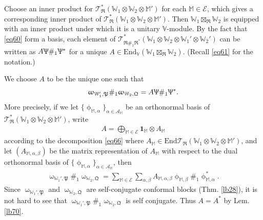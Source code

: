 \documentclass[11pt,b5paper,notitlepage]{article}
\theoremstyle{definition}
\theoremstyle{plain}
\newcommand{\fk}{\mathfrak}
\newcommand{\mc}{\mathcal}
\newcommand{\End}{\mathrm{End}} %
\newcommand{\id}{\mathbf{1}}
\newcommand{\scr}{\mathscr}
\newcommand{\Vbb}{\mathbb V}
\newcommand{\Wbb}{\mathbb W}
\newcommand{\Mbb}{\mathbb M}
\numberwithin{equation}{section}
\begin{document}
Choose an inner product for $\scr T_{\fk R}^*(\Wbb_1\otimes\Wbb_2\otimes\Mbb')$ for each $\Mbb\in\mc E$, which gives a corresponding inner product of $\scr T_{\fk R}^*(\Wbb_1\otimes\Wbb_2\otimes\Mbb')$. Then $\Wbb_1\boxtimes_{\fk R}\Wbb_2$ is equipped with an inner product under which it is a unitary $\Vbb$-module. By the fact that \eqref{eq60} form a basis, each element of $\scr T_{\fk R\#_1\fk R^*}^*(\Wbb_1\otimes\Wbb_2\otimes\Wbb_1'\otimes\Wbb_2')$ can be written as $A\Uppsi\#_1\Uppsi^*$ for a unique $A\in\End_\Vbb(\Wbb_1\boxtimes_{\fk R}\Wbb_2)$. (Recall \eqref{eq61} for the notation.)

We choose $A$ to be the unique one such that
\begin{align}
\upomega_{\Wbb_1',\fk P}\#_1\upomega_{\Wbb_2,\fk Q}=A\Uppsi\#_1\Uppsi^*. \label{eq64}
\end{align}
More precisely, if we let $\{\upphi_{\Mbb,\alpha}\}_{\alpha\in\mc A_\Mbb}$ be an orthonormal basis of $\scr T_{\fk R}^*(\Wbb_1\otimes\Wbb_2\otimes\Mbb')$, write
\begin{align*}
A=\bigoplus_{\Mbb\in\mc E}\id_\Mbb\otimes A_\Mbb
\end{align*}
according to the decomposition \eqref{eq66} where $A_\Mbb\in\End \scr T_{\fk R}(\Wbb_1\otimes\Wbb_2\otimes\Mbb')$, and let $(A_{\Mbb,\alpha,\beta})$ be the matrix representation of $A_\Mbb$ with respect to the dual orthonormal basis of $\{\upphi_{\Mbb,\alpha}\}_{\alpha\in\mc A_\Mbb}$, then
\begin{align}
\upomega_{\Wbb_1',\fk P}\#_1\upomega_{\Wbb_2,\fk Q}=\sum_{\Mbb\in\mc E}\sum_{\alpha,\beta}A_{\Mbb,\alpha,\beta}\upphi_{\Mbb,\beta}\#_1\upphi_{\Mbb,\alpha}^*. \label{eq67}
\end{align}
Since $\upomega_{\Wbb_1',\fk P}$ and $\upomega_{\Wbb_2,\fk Q}$ are self-conjugate conformal blocks (Thm. \ref{lb28}),   it is not hard to see that  $\upomega_{\Wbb_1',\fk P}\#_1\upomega_{\Wbb_2,\fk Q}$ is self conjugate. Thus $A=A^*$ by Lem. \ref{lb70}. 
\end{document}
